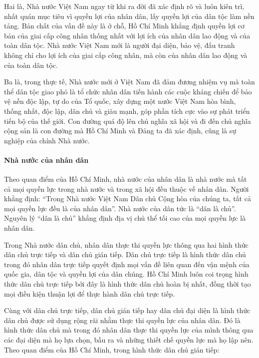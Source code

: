 Hai là, Nhà nước Việt Nam ngay từ khi ra đời đã xác định rõ và luôn kiên trì, nhất quán mục tiêu vì quyền lợi của nhân dân, lấy quyền lợi của dân tộc làm nền tảng. Bản chất của vấn đề này là ở chỗ, Hồ Chí Minh khẳng định quyền lợi cơ bản của giai cấp công nhân thống nhất với lợi ích của nhân dân lao động và của toàn dân tộc. Nhà nước Việt Nam mới là người đại diện, bảo vệ, đấu tranh không chỉ cho lợi ích của giai cấp công nhân, mà còn của nhân dân lao động và của toàn dân tộc.

Ba là, trong thực tế, Nhà nước mới ở Việt Nam đã đảm đương nhiệm vụ mà toàn thể dân tộc giao phó là tổ chức nhân dân tiến hành các cuộc kháng chiến để bảo vệ nền độc lập, tự do của Tổ quốc, xây dựng một nước Việt Nam hòa bình, thống nhất, độc lập, dân chủ và giàu mạnh, góp phần tích cực vào sự phát triển tiến bộ của thế giới. Con đường quá độ lên chủ nghĩa xã hội và đi đến chủ nghĩa cộng sản là con đường mà Hồ Chí Minh và Đảng ta đã xác định, cũng là sự nghiệp của chính Nhà nước.

\paragraph{Nhà nước của nhân dân}
Theo quan điểm của Hồ Chí Minh, nhà nước của nhân dân là nhà nước mà tất cả mọi quyền lực trong nhà nước và trong xã hội đều thuộc về nhân dân. Người khẳng định: “Trong Nhà nước Việt Nam Dân chủ Cộng hòa của chúng ta, tất cả mọi quyền lực đều là của nhân dân”. Nhà nước của dân tức là “dân là chủ”. Nguyên lý “dân là chủ” khẳng định địa vị chủ thể tối cao của mọi quyền lực là nhân dân.

Trong Nhà nước dân chủ, nhân dân thực thi quyền lực thông qua hai hình thức dân chủ trực tiếp và dân chủ gián tiếp. Dân chủ trực tiếp là hình thức dân chủ trong đó nhân dân trực tiếp quyết định mọi vấn đề liên quan đến vận mệnh của quốc gia, dân tộc và quyền lợi của dân chúng. Hồ Chí Minh luôn coi trọng hình thức dân chủ trực tiếp bởi đây là hình thức dân chủ hoàn bị nhất, đồng thời tạo mọi điều kiện thuận lợi để thực hành dân chủ trực tiếp.

Cùng với dân chủ trực tiếp, dân chủ gián tiếp hay dân chủ đại diện là hình thức dân chủ được sử dụng rộng rãi nhằm thực thi quyền lực của nhân dân. Đó là hình thức dân chủ mà trong đó nhân dân thực thi quyền lực của mình thông qua các đại diện mà họ lựa chọn, bầu ra và những thiết chế quyền lực mà họ lập nên. Theo quan điểm của Hồ Chí Minh, trong hình thức dân chủ gián tiếp:

